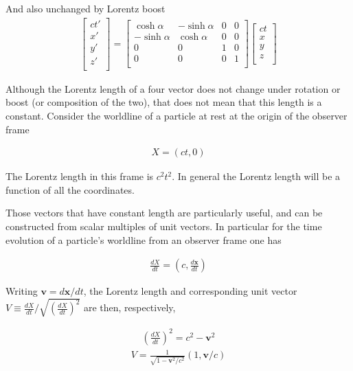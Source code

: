 \documentclass[]{eliblog}
\newcommand{\Bv}[0]{\mathbf{v}}
\newcommand{\Bx}[0]{\mathbf{x}}
\newcommand{\inv}[1]{\frac{1}{#1}}
\begin{document}
And also unchanged by Lorentz boost
\begin{align}
\begin{bmatrix}
ct' \\
x' \\
y' \\
z' \\
\end{bmatrix}
=
\begin{bmatrix}
\cosh\alpha & -\sinh\alpha & 0 & 0 \\
-\sinh\alpha & \cosh\alpha & 0 & 0 \\
0 & 0 & 1 & 0 \\
0 & 0 & 0 & 1 \\
\end{bmatrix}
\begin{bmatrix}
ct \\
x \\
y \\
z \\
\end{bmatrix}
\end{align}

Although the Lorentz length of a four vector does not change under rotation or boost (or composition of the two), that does not mean that
this length is a constant.  Consider the worldline of a particle at rest at the origin of the observer frame

\begin{align}
X = (c t, 0)
\end{align}

The Lorentz length in this frame is $c^2 t^2$.  In general the Lorentz length will be a function of all the coordinates.  

Those vectors that have constant length are particularly useful, and can be constructed from scalar multiples of unit vectors.  
In particular for the time evolution of a particle's worldline from an observer frame one has

\begin{align}
\frac{dX}{dt} = \left(c, \frac{d\Bx}{dt}\right)
\end{align}

Writing $\Bv = d\Bx/dt$, the Lorentz length and corresponding unit vector $V \equiv {\frac{dX}{dt}}/{\sqrt{\left(\frac{dX}{dt}\right)^2}}$ are then, respectively,

\begin{align}
\left(\frac{dX}{dt}\right)^2 = c^2 - \Bv^2
\end{align}
\begin{align}
V = \inv{\sqrt{1 - \Bv^2/c^2 }} \left(1, \Bv/c \right)
\end{align}
\end{document}
